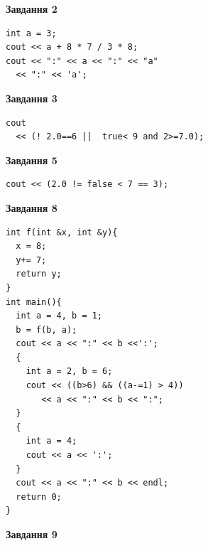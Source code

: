 \documentclass[12pt, ukrainian]{article}
\begin{document}
{\begin {large}
\begin{minipage}[t]{7.0cm}
\end{minipage}
\vline \hspace{1mm}
\begin{minipage}[t]{11.0cm}

\begin{center}
\textbf{Завдання 2}
\end{center}
\vspace{-8mm}

\begin{verbatim}
int a = 3;
cout << a + 8 * 7 / 3 * 8;
cout << ":" << a << ":" << "a" 
  << ":" << 'a';
\end{verbatim}



\begin{center}
\textbf{Завдання 3}
\end{center}
\vspace{-8mm}

\begin{verbatim}
cout 
  << (! 2.0==6 ||  true< 9 and 2>=7.0);
\end{verbatim}



\begin{center}
\textbf{Завдання 5}
\end{center}
\vspace{-8mm}

\begin{verbatim}
cout << (2.0 != false < 7 == 3);
\end{verbatim}



\begin{center}
\textbf{Завдання 8}
\end{center}
\vspace{-8mm}

\begin{verbatim}
int f(int &x, int &y){
  x = 8;
  y+= 7;
  return y;
}
int main(){
  int a = 4, b = 1;
  b = f(b, a);
  cout << a << ":" << b <<':';
  {
    int a = 2, b = 6;
    cout << ((b>6) && ((a-=1) > 4))
       << a << ":" << b << ":";
  }
  {
    int a = 4;
    cout << a << ':';
  }
  cout << a << ":" << b << endl;
  return 0;
}
\end{verbatim}

\end{minipage}


\begin{minipage}[t]{7.0cm}

\begin{center}
\textbf{Завдання 9}
\end{center}
\vspace{-8mm}


\end{minipage}
\end{large}}
\end{document}
